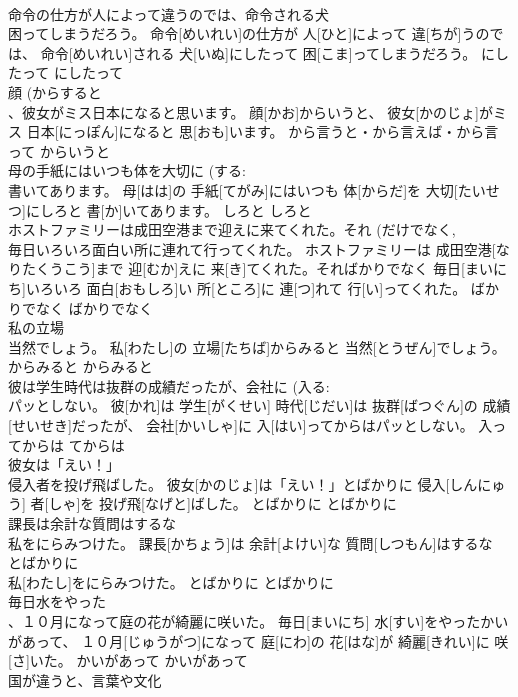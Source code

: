 \documentclass[8pt]{extreport}
\begin{document}
\begin{CJK}{UTF8}{min}
\\	命令の仕方が人によって違うのでは、命令される犬 
\\	困ってしまうだろう。	命令[めいれい]の仕方が 人[ひと]によって 違[ちが]うのでは、 命令[めいれい]される 犬[いぬ]にしたって 困[こま]ってしまうだろう。	にしたって	にしたって	
\\	顔 (からすると 
\\	、彼女がミス日本になると思います。	顔[かお]からいうと、 彼女[かのじょ]がミス 日本[にっぽん]になると 思[おも]います。	から言うと・から言えば・から言って	からいうと	
\\	母の手紙にはいつも体を大切に (する: 
\\	書いてあります。	母[はは]の 手紙[てがみ]にはいつも 体[からだ]を 大切[たいせつ]にしろと 書[か]いてあります。	しろと	しろと	
\\	ホストファミリーは成田空港まで迎えに来てくれた。それ (だけでなく, 
\\	毎日いろいろ面白い所に連れて行ってくれた。	ホストファミリーは 成田空港[なりたくうこう]まで 迎[むか]えに 来[き]てくれた。そればかりでなく 毎日[まいにち]いろいろ 面白[おもしろ]い 所[ところ]に 連[つ]れて 行[い]ってくれた。	ばかりでなく	ばかりでなく	
\\	私の立場 
\\	当然でしょう。	私[わたし]の 立場[たちば]からみると 当然[とうぜん]でしょう。	からみると	からみると	
\\	彼は学生時代は抜群の成績だったが、会社に (入る: 
\\	パッとしない。	彼[かれ]は 学生[がくせい] 時代[じだい]は 抜群[ばつぐん]の 成績[せいせき]だったが、 会社[かいしゃ]に 入[はい]ってからはパッとしない。	入ってからは	てからは	
\\	彼女は「えい！」
\\	侵入者を投げ飛ばした。	彼女[かのじょ]は「えい！」とばかりに 侵入[しんにゅう] 者[しゃ]を 投げ飛[なげと]ばした。	とばかりに	とばかりに	
\\	課長は余計な質問はするな 
\\	私をにらみつけた。	課長[かちょう]は 余計[よけい]な 質問[しつもん]はするな
\\	とばかりに
\\	私[わたし]をにらみつけた。	とばかりに	とばかりに	
\\	毎日水をやった 
\\	、１０月になって庭の花が綺麗に咲いた。	毎日[まいにち] 水[すい]をやったかいがあって、 １０月[じゅうがつ]になって 庭[にわ]の 花[はな]が 綺麗[きれい]に 咲[さ]いた。	かいがあって	かいがあって~	
\\	国が違うと、言葉や文化 

\end{CJK}
\end{document}
